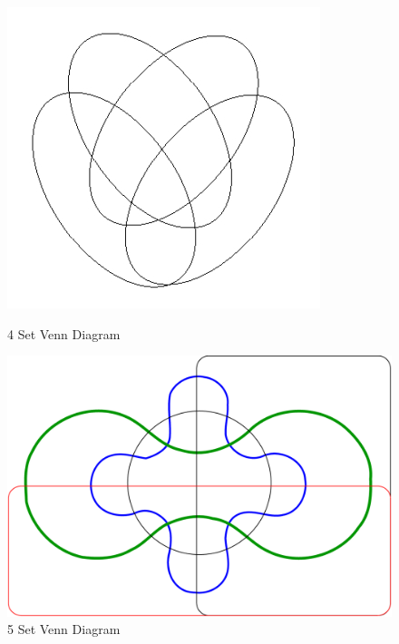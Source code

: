 \documentclass[12pt,a4paper]{report}
\begin{document}
\begin{figure}[!h]
  \centering
  \begin{minipage}[b]{0.4\textwidth}
    \includegraphics[width=\textwidth]{4SetVennDiagram}
    \caption{4 Set Venn Diagram}
    \label{fig:4SetVenn}
  \end{minipage}
  \hfill
  \begin{minipage}[b]{0.4\textwidth}
    \includegraphics[width=\textwidth]{5SetVennDiagram}
    \caption{5 Set Venn Diagram}
    \label{fig:5SetVenn}
  \end{minipage}
\end{figure}
\FloatBarrier
\end{document}
